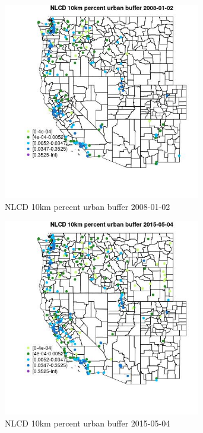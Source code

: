 \begin{figure} 
\centering  
\includegraphics[width=0.77\textwidth]{Code_Outputs/Report_ML_input_PM25_Step4_part_e_de_duplicated_aves_compiled_2019-05-18wNAs_MapObsNLCD_10km_percent_urban_buffer2008-01-02.jpg} 
\caption{\label{fig:Report_ML_input_PM25_Step4_part_e_de_duplicated_aves_compiled_2019-05-18wNAsMapObsNLCD_10km_percent_urban_buffer2008-01-02}NLCD 10km percent urban buffer 2008-01-02} 
\end{figure} 
 

\begin{figure} 
\centering  
\includegraphics[width=0.77\textwidth]{Code_Outputs/Report_ML_input_PM25_Step4_part_e_de_duplicated_aves_compiled_2019-05-18wNAs_MapObsNLCD_10km_percent_urban_buffer2015-05-04.jpg} 
\caption{\label{fig:Report_ML_input_PM25_Step4_part_e_de_duplicated_aves_compiled_2019-05-18wNAsMapObsNLCD_10km_percent_urban_buffer2015-05-04}NLCD 10km percent urban buffer 2015-05-04} 
\end{figure} 
 

